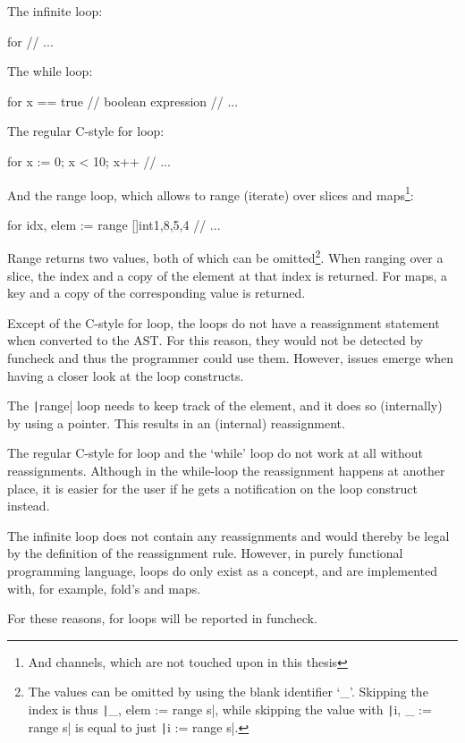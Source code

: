 The infinite loop:
\begin{gocode}
for {
	// ...
}
\end{gocode}
The while loop:
\begin{gocode}
for x == true { // boolean expression
	// ...
}
\end{gocode}
The regular C-style for loop:
\begin{gocode}
for x := 0; x < 10; x++ {
	// ...
}
\end{gocode}
And the range loop, which allows to range (iterate) over slices and maps\footnote{And
channels, which are not touched upon in this thesis}:
\begin{gocode}
for idx, elem := range []int{1,8,5,4} {
	// ...
}
\end{gocode}
Range returns two values, both of which can be omitted\footnote{The values can be omitted
    by using the blank identifier `\_'. Skipping the index is thus
    \texttt|_, elem := range s|, while skipping the value with
\texttt|i, _ := range s| is equal to just \texttt|i := range s|.}. When
ranging over a slice, the index and a copy of the element at that index is returned. For
maps, a key and a copy of the corresponding value is returned.

Except of the C-style for loop, the loops do not have a reassignment statement when
converted to the AST. For this reason, they would not be detected by funcheck and thus
the programmer could use them.
However, issues emerge when having a closer look at the loop constructs.

The \texttt|range| loop needs to keep track of the element, and it does so (internally)
by using a pointer. This results in an (internal) reassignment.

The regular C-style for loop and the `while' loop do not work at all without reassignments.
Although in the while-loop the reassignment happens at another place, it is easier for the
user if he gets a notification on the loop construct instead.

The infinite loop does not contain any reassignments and would thereby be legal by the
definition of the reassignment rule. However, in purely functional programming language,
loops do only exist as a concept, and are implemented with, for example, fold's and maps.

For these reasons, for loops will be reported in funcheck.
